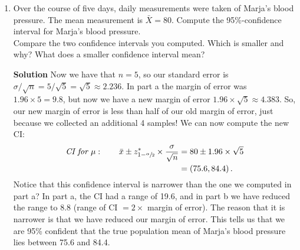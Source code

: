 \begin{enumerate}
\begin{enumerate}
        \item Over the course of five days, daily measurements were taken of Marja’s blood pressure. The mean measurement is $\bar{X}= 80$. Compute the 95\%-confidence interval for Marja’s blood pressure. \\
        Compare the two confidence intervals you computed. Which is smaller and why? What does a smaller confidence interval mean?
        \begin{framed}{\textbf{Solution}}
        Now we have that $n=5$, so our standard error is $\sigma/\sqrt{n} = 5/\sqrt{5} = \sqrt{5} \approx 2.236$. In part a the margin of error was $1.96 \times 5 = 9.8$, but now we have a new margin of error $1.96 \times \sqrt{5} \approx 4.383$. So, our new margin of error is less than half of our old margin of error, just because we collected an additional 4 samples! We can now compute the new CI:
        \begin{align}
            \textit{CI for } \mu : \qquad \bar{x} \pm z^*_{1 - \sfrac{\alpha}{2}} \times \frac{\sigma}{\sqrt{n}} &= 80 \pm 1.96 \times \sqrt{5} \\
            &= \left( 75.6, 84.4\right).
        \end{align}
        Notice that this confidence interval is narrower than the one we computed in part a? In part a, the CI had a range of 19.6, and in part b we have reduced the range to 8.8 (range of CI $= 2 \times $ margin of error). The reason that it is narrower is that we have reduced our margin of error. This tells us that we are 95\% confident that the true population mean of Marja's blood pressure lies between 75.6 and 84.4.
        \end{framed}
    \end{enumerate}
    

\end{enumerate}

